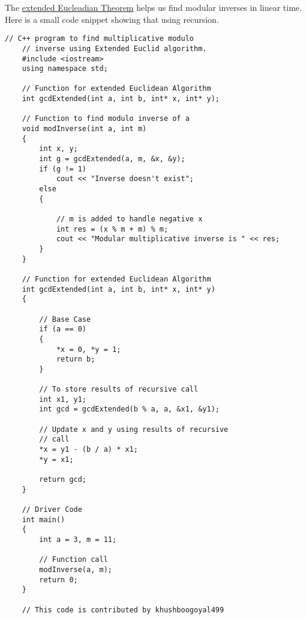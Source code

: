 	\begin{tcolorbox}[title=Recursive algorithm for Extended Eucleadian Theorem]\label{add:codeForRecursive}	
	The \hyperref[theo:extendedEuclid]{extended Eucleadian Theorem} helps us find modular inverses in linear time. Here is a small code snippet showing that using recursion.
		\begin{lstlisting}[style=CStyle]
	// C++ program to find multiplicative modulo
	// inverse using Extended Euclid algorithm.
	#include <iostream>
	using namespace std;

	// Function for extended Euclidean Algorithm
	int gcdExtended(int a, int b, int* x, int* y);

	// Function to find modulo inverse of a
	void modInverse(int a, int m)
	{
		int x, y;
		int g = gcdExtended(a, m, &x, &y);
		if (g != 1)
			cout << "Inverse doesn't exist";
		else
		{
			
			// m is added to handle negative x
			int res = (x % m + m) % m;
			cout << "Modular multiplicative inverse is " << res;
		}
	}

	// Function for extended Euclidean Algorithm
	int gcdExtended(int a, int b, int* x, int* y)
	{
		
		// Base Case
		if (a == 0)
		{
			*x = 0, *y = 1;
			return b;
		}
		
		// To store results of recursive call
		int x1, y1;
		int gcd = gcdExtended(b % a, a, &x1, &y1);

		// Update x and y using results of recursive
		// call
		*x = y1 - (b / a) * x1;
		*y = x1;

		return gcd;
	}

	// Driver Code
	int main()
	{
		int a = 3, m = 11;

		// Function call
		modInverse(a, m);
		return 0;
	}

	// This code is contributed by khushboogoyal499

		\end{lstlisting}
	\end{tcolorbox}